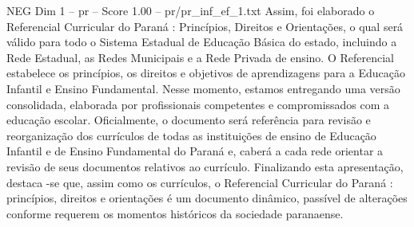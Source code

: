 \begin{textsample}{NEG Dim 1 – pr – Score 1.00 – pr/pr\_inf\_ef\_1.txt}
Assim, foi elaborado o Referencial Curricular do Paraná : Princípios, Direitos e Orientações, o qual será válido para todo o Sistema Estadual de Educação Básica do estado, incluindo a Rede Estadual, as Redes Municipais e a Rede Privada de ensino.
O Referencial estabelece os princípios, os direitos e objetivos de aprendizagens para a Educação Infantil e Ensino Fundamental.
Nesse momento, estamos entregando uma versão consolidada, elaborada por profissionais competentes e compromissados com a educação escolar.
Oficialmente, o documento será referência para revisão e reorganização dos currículos de todas as instituições de ensino de Educação Infantil e de Ensino Fundamental do Paraná e, caberá a cada rede orientar a revisão de seus documentos relativos ao currículo.
Finalizando esta apresentação, destaca -se que, assim como os currículos, o Referencial Curricular do Paraná : princípios, direitos e orientações é um documento dinâmico, passível de alterações conforme requerem os momentos históricos da sociedade paranaense.

\end{textsample}
